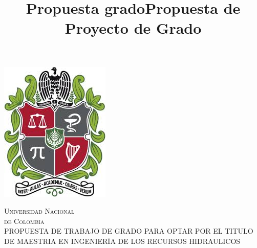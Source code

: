 \documentclass[10pt]{article}
\title{Propuesta grado}
\title{Propuesta de Proyecto de Grado}
\begin{document}
\begin{center}																		%
\newcommand{\HRule}{\rule{\linewidth}{0.5mm}}									%
\begin{minipage}{0.48\textwidth} \begin{flushleft}
\includegraphics[scale = 0.4]{EscudoU.jpg}
\end{flushleft}\end{minipage}
\begin{minipage}{0.48\textwidth} \begin{flushright}
\end{flushright}\end{minipage}

\vspace*{-1.5cm}								%
\textsc{\huge Universidad Nacional\\ \vspace{5px} de Colombia}\\[1.5cm]	

\textsc{\large PROPUESTA DE TRABAJO DE GRADO PARA OPTAR POR EL TITULO DE MAESTRIA EN INGENIERÏA DE LOS RECURSOS HIDRAULICOS}\\[2cm]													%


\end{center}
\end{document}
